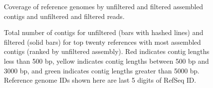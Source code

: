 \documentclass[11pt]{article} %
\begin{document}
\begin{figure}[ht]
\caption{Coverage of reference genomes by unfiltered and filtered assembled contigs and unfiltered and filtered reads.}
\label{coverage2}
\end{figure}

\begin{figure}[ht]
\caption{Total number of contigs for unfiltered (bars with hashed lines) and filtered (solid bars) for top twenty references with most assembled contigs (ranked by unfiltered assembly).  Red indicates contig lengths less than 500 bp, yellow indicates contig lengths between 500 bp and 3000 bp, and green indicates contig lengths greater than 5000 bp.  Reference genome IDs shown here are last 5 digits of RefSeq ID.}
\label{contig-lengths}
\end{figure}
\end{document}
